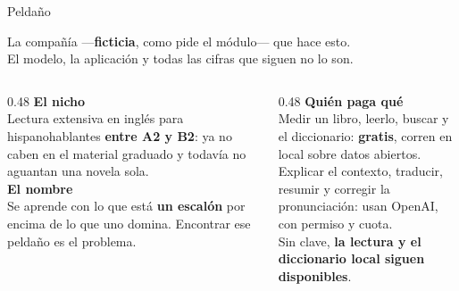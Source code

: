 \documentclass[aspectratio=169,11pt]{beamer}
\begin{document}
\begin{frame}{Peldaño}
\vspace{3mm}
\begin{center}
{\large La compañía —\textbf{ficticia}, como pide el módulo— que hace esto.}\\[2pt]
{\small\color{llgris} El modelo, la aplicación y todas las cifras que siguen no lo son.}\\[7mm]
\end{center}

\begin{columns}[T]
\begin{column}{0.48\textwidth}
\textbf{\color{llazul} El nicho}\\[2pt]
{\small Lectura extensiva en inglés para hispanohablantes \textbf{entre A2 y B2}:
ya no caben en el material graduado y todavía no aguantan una novela sola.}\\[5mm]

\textbf{\color{llazul} El nombre}\\[2pt]
{\small Se aprende con lo que está \textbf{un escalón} por encima de lo que uno
domina. Encontrar ese peldaño es el problema.}
\end{column}
\begin{column}{0.48\textwidth}
\textbf{\color{llazul} Quién paga qué}\\[2pt]
{\small Medir un libro, leerlo, buscar y el diccionario: \textbf{gratis}, corren
en local sobre datos abiertos.\\[3pt]
Explicar el contexto, traducir, resumir y corregir la pronunciación: usan
OpenAI, con permiso y cuota.\\[3pt]
Sin clave, \textbf{la lectura y el diccionario local siguen disponibles}.}
\end{column}
\end{columns}
\end{frame}
\end{document}
